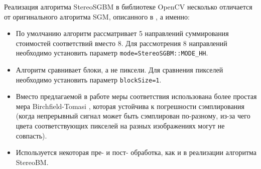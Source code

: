 \documentclass[oneside,final,12pt]{scrartcl}
\begin{document}
			Реализация алгоритма StereoSGBM в библиотеке OpenCV несколько отличается от оригинального алгоритма SGM, описанного в \cite{Hirschmuller2008}, а именно:
			\begin{itemize}
				 	\item По умолчанию алгоритм рассматривает 5 направлений суммирования стоимостей соответствий вместо 8. Для рассмотрения 8 направлений необходимо установить параметр \texttt{mode=StereoSGBM::MODE\_HH}.

				 	\item Алгоритм сравнивает блоки, а не пиксели. Для сравнения пикселей необходимо установить параметр \texttt{blockSize=1}.

				 	\item Вместо предлагаемой в работе меры соответствия использована более простая мера Birchfield-Tomasi \cite{Birchfield1998}, которая устойчива к погрешности сэмплирования (когда непрерывный сигнал может быть сэмплирован по-разному, из-за чего цвета соответствующих пикселей на разных изображениях могут не совпасть).

				 	\item Используется некоторая пре- и пост- обработка, как и в реализации алгоритма StereoBM.
			\end{itemize}
\end{document}
